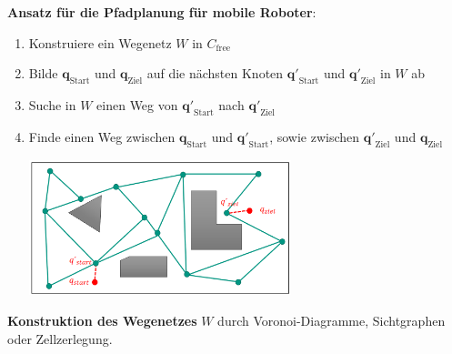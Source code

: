 \textbf{Ansatz für die Pfadplanung für mobile Roboter}:
\begin{enumerate}
	\item Konstruiere ein Wegenetz $W$ in $C_\text{free}$
	\item Bilde $\mathbf{q}_\text{Start}$ und $\mathbf{q}_\text{Ziel}$ auf die nächsten Knoten $\mathbf{q'}_\text{Start}$ und $\mathbf{q'}_\text{Ziel}$ in $W$ ab
	\item Suche in $W$ einen Weg von $\mathbf{q'}_\text{Start}$ nach $\mathbf{q'}_\text{Ziel}$
	\item Finde einen Weg zwischen $\mathbf{q}_\text{Start}$ und  $\mathbf{q'}_\text{Start}$, sowie zwischen $\mathbf{q'}_\text{Ziel}$ und $\mathbf{q}_\text{Ziel}$
	\begin{center}
		\includegraphics[width=0.6\textwidth]{images/pfadplanung.png}
	\end{center}
\end{enumerate}

\textbf{Konstruktion des Wegenetzes} $W$ durch Voronoi-Diagramme, Sichtgraphen oder  Zellzerlegung.\\

